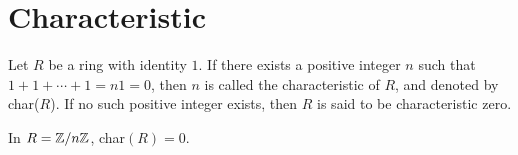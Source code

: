 \section{Characteristic}
\begin{definition}[Characteristic]
    Let $R$ be a ring with identity $1$. If there exists a positive integer $n$ such that $1 + 1 + \cdots + 1 = n1 = 0$, then $n$ is called the characteristic of $R$, and denoted by char($R$). If no such positive integer exists, then $R$ is said to be characteristic zero.
\end{definition}
\begin{eg}
    In $R = \mathbb{Z}/n\mathbb{Z}$, char$(R) = 0$.
\end{eg}
